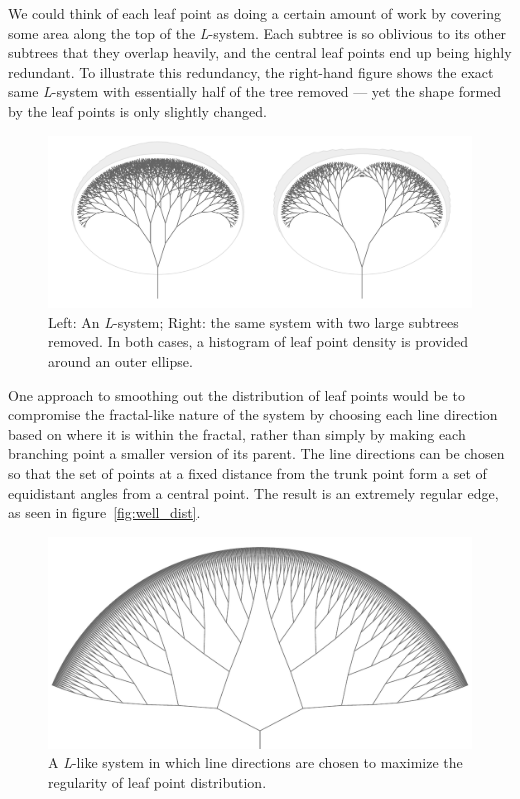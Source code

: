 \documentclass[]{article}
\begin{document}
We could think of each leaf point as doing a certain amount of work by
covering some area along the top of the \emph{L}-system. Each subtree is
so oblivious to its other subtrees that they overlap heavily, and the
central leaf points end up being highly redundant. To illustrate this
redundancy, the right-hand figure shows the exact same \emph{L}-system
with essentially half of the tree removed --- yet the shape formed by
the leaf points is only slightly changed.

\begin{figure}[htbp]
\centering
\includegraphics{images/pdfs/ellsystem2.pdf}
\caption{\label{fig:ellsystem}Left: An \emph{L}-system; Right: the same
system with two large subtrees removed. In both cases, a histogram of
leaf point density is provided around an outer
ellipse.}\label{fig:ellsystem}
\end{figure}

One approach to smoothing out the distribution of leaf points would be
to compromise the fractal-like nature of the system by choosing each
line direction based on where it is within the fractal, rather than
simply by making each branching point a smaller version of its parent.
The line directions can be chosen so that the set of points at a fixed
distance from the trunk point form a set of equidistant angles from a
central point. The result is an extremely regular edge, as seen in
figure~\ref{fig:well_dist}.

\begin{figure}[htbp]
\centering
\includegraphics{images/pdfs/well_distributed_ell_like_system.pdf}
\caption{\label{fig:well_dist}A \emph{L}-like system in which line
directions are chosen to maximize the regularity of leaf point
distribution.}\label{fig:wellux5fdist}
\end{figure}
\end{document}
